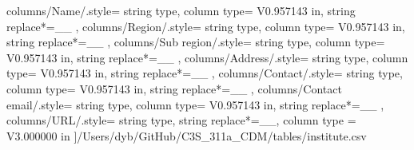 \begin{landscape}
    columns/Name/.style={
            string type, 
            column type= V{0.957143 in}, 
            string replace*={_}{\_}
        },
    columns/Region/.style={
            string type, 
            column type= V{0.957143 in}, 
            string replace*={_}{\_}
        },
    columns/Sub region/.style={
            string type, 
            column type= V{0.957143 in}, 
            string replace*={_}{\_}
        },
    columns/Address/.style={
            string type, 
            column type= V{0.957143 in}, 
            string replace*={_}{\_}
        },
    columns/Contact/.style={
            string type, 
            column type= V{0.957143 in}, 
            string replace*={_}{\_}
        },
    columns/Contact email/.style={
            string type, 
            column type= V{0.957143 in}, 
            string replace*={_}{\_}
        },
    columns/URL/.style={
            string type, 
            string replace*={_}{\_},
            column type = V{3.000000 in}
        }
    ]{/Users/dyb/GitHub/C3S_311a_CDM/tables/institute.csv}
\end{landscape}
